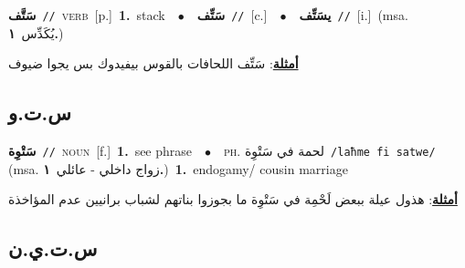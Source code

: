 \documentclass[10pt,a4paper,twoside]{article} %
\begin{document}
\begin{multicols}{2}
{\setlength\topsep{0pt}\textbf{\foreignlanguage{arabic}{سَتَّف}}\ {\color{gray}\texttt{//}\color{black}}\ \textsc{verb}\ [p.]\ \textbf{1.}~stack\ \ $\bullet$\ \ \setlength\topsep{0pt}\textbf{\foreignlanguage{arabic}{سَتِّف}}\ {\color{gray}\texttt{//}\color{black}}\ [c.]\ \ $\bullet$\ \ \setlength\topsep{0pt}\textbf{\foreignlanguage{arabic}{يسَتِّف}}\ {\color{gray}\texttt{//}\color{black}}\ [i.]\ \color{gray}(msa. \foreignlanguage{arabic}{يُكَدِّس}~\foreignlanguage{arabic}{\textbf{١.}})\color{black}\  \begin{flushright}\color{gray}\foreignlanguage{arabic}{\textbf{\underline{\foreignlanguage{arabic}{أمثلة}}}: سَتِّف اللحافات بالقوس بيفيدوك بس يجوا ضيوف}\end{flushright}\color{black}} \vspace{2mm}

\vspace{-3mm}
\subsection*{\color{blue}\foreignlanguage{arabic}{س.ت.و}\color{blue}{}} 

{\setlength\topsep{0pt}\textbf{\foreignlanguage{arabic}{سَتْوِة}}\ {\color{gray}\texttt{//}\color{black}}\ \textsc{noun}\ [f.]\ \textbf{1.}~see phrase\ \ $\bullet$\ \ \textsc{ph.} \color{gray} \foreignlanguage{arabic}{لحمة في سَتْوِة}\color{black}\ {\color{gray}\texttt{/{\sffamily laħme fi satwe}/}\color{black}}\ \color{gray} (msa. \foreignlanguage{arabic}{زواج داخلي - عائلي}~\foreignlanguage{arabic}{\textbf{١.}})\color{black}\ \textbf{1.}~endogamy/ cousin marriage\  \begin{flushright}\color{gray}\foreignlanguage{arabic}{\textbf{\underline{\foreignlanguage{arabic}{أمثلة}}}: هذول عيلة ببعض لَحْمِة في سَتْوِة ما بجوزوا بناتهم لشباب برانيين عدم المؤاخذة}\end{flushright}\color{black}} \vspace{2mm}

\vspace{-3mm}
\subsection*{\color{blue}\foreignlanguage{arabic}{س.ت.ي.ن}\color{blue}{ (ntws)}} 


\end{multicols}
\end{document}
